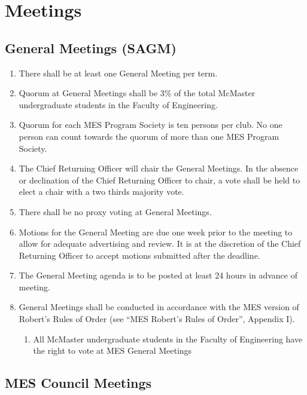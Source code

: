 \section{Meetings}
\label{meetings}

\subsection{General Meetings (SAGM)}
\label{general-meetings-sagm}
\begin{enumerate}
 \item
  There shall be at least one General Meeting per term.
 \item
  Quorum at General Meetings shall be 3\% of the total McMaster undergraduate students in the Faculty of Engineering.
 \item
  Quorum for each MES Program Society is ten persons per club. No one person can count towards the quorum of more than one MES Program Society.
 \item
  The Chief Returning Officer will chair the General Meetings. In the absence or declination of the Chief Returning Officer to chair, a vote shall be held to elect a chair with a two thirds majority vote.
 \item
  There shall be no proxy voting at General Meetings.
 \item
  Motions for the General Meeting are due one week prior to the meeting to allow for adequate advertising and review. It is at the discretion of the Chief Returning Officer to accept motions submitted after the deadline.
 \item
  The General Meeting agenda is to be posted at least 24 hours in advance of meeting.
 \item
  General Meetings shall be conducted in accordance with the MES version of Robert's Rules of Order (see ``MES Robert's Rules of Order'', Appendix I).

  \begin{enumerate}
   \item
    All McMaster undergraduate students in the Faculty of Engineering have the right to vote at MES General Meetings
  \end{enumerate}
\end{enumerate}

\subsection{MES Council Meetings}
\label{mes-council-meetings}

